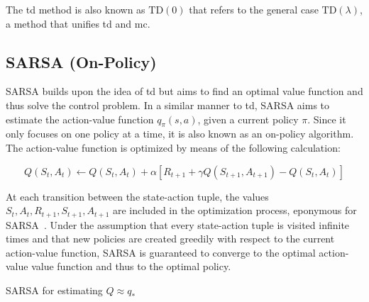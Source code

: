 \documentclass[draft,final]{vutinfth} %
\newcommand{\p}[1]{see p. #1}
\begin{document}
    The \gls{td} method is also known as $\text{TD}(0)$ that refers to the general case $\text{TD}(\lambda)$, a method that unifies \gls{td} and \gls{mc}.

    \subsection{SARSA (On-Policy)}\label{subsec:sarsanullon-policynull}

    SARSA builds upon the idea of \gls{td} but aims to find an optimal value function and thus solve the control problem.
    In a similar manner to \gls{td}, SARSA aims to estimate the action-value function $q_\pi(s,a)$, given a current policy $\pi$.
    Since it only focuses on one policy at a time, it is also known as an on-policy algorithm.
    The action-value function is optimized by means of the following calculation:

    \begin{equation}
        Q(S_t,A_t) \leftarrow Q(S_t,A_t) + \alpha [R_{t+1} + \gamma Q(S_{t+1},A_{t+1}) - Q(S_{t},A_{t}) ]
    \end{equation}

    At each transition between the state-action tuple, the values $S_{t},A_{t},R_{t+1},S_{t+1},A_{t+1}$ are included in the optimization process, eponymous for SARSA~\citep[\p{129}]{sutton_reinforcement_2018}.
    Under the assumption that every state-action tuple is visited infinite times and that new policies are created greedily with respect to the current action-value function, SARSA is guaranteed to converge to the optimal action-value value function and thus to the optimal policy.

    \begin{algorithm}
        \caption[SARSA for estimating $Q \approx q_*$]{SARSA for estimating $Q \approx q_*$\protect\footnotemark}
        \label{alg:sarsa}

        \KwIn{Step size $\alpha \in (0,1]$, small $\epsilon > 0$}
        \;



    \end{algorithm}
\end{document}

